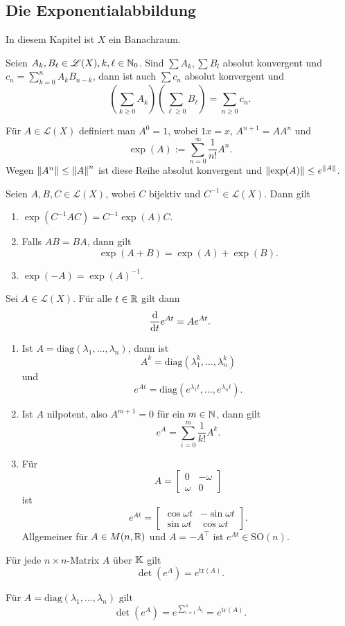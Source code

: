 \subsection{Die Exponentialabbildung}
In diesem Kapitel ist $X$ ein Banachraum.
\begin{satz}\label{satz4_10}
	Seien $A_k, B_\ell \in \mathscr{L}(X), k, \ell \in \mathbb{N}_0$. Sind $\sum A_k, \sum B_l$ absolut konvergent und $c_n = \sum_{k=0}^n A_k B_{n-k}$, dann ist auch $\sum c_n$ absolut konvergent und
	\[\left(\sum_{k\geq0} A_k\right)\left(\sum_{\ell \geq 0} B_\ell\right) = \sum_{n \geq 0} c_n.\]
\end{satz}
Für $A \in \mathscr{L}(X)$ definiert man $A^0 = 1$, wobei $1x = x$, $A^{n+1} = AA^n$ und
\[\exp(A) := \sum_{n = 0}^\infty \frac{1}{n!} A^n.\]
Wegen $\left\lVert A^n\right\rVert \leq \left\lVert A\right\rVert^n$ ist diese Reihe absolut konvergent und $\left\lVert\exp(A)\right\rVert \leq e^{\left\lVert A\right\rVert}$.
\begin{satz}\label{satz4_11}
	Seien $A, B, C \in \mathscr{L}(X)$, wobei $C$ bijektiv und $C^{-1} \in \mathscr{L}(X)$. Dann gilt
	\begin{enumerate}[label=(\alph*)]
		\item $\exp(C^{-1}AC) = C^{-1}\exp(A) C$.
		\item Falls $AB = BA$, dann gilt
		\[\exp(A + B) = \exp(A) + \exp(B).\]
		\item $\exp(-A) = \exp(A)^{-1}$.
	\end{enumerate}
\end{satz}
\begin{satz}\label{satz4_12}
	Sei $A \in \mathscr{L}(X)$. Für alle $t \in \mathbb{R}$ gilt dann
	\[\frac{\mathrm{d}}{\mathrm{d} t} e^{At} = A e^{At}.\]
\end{satz}
\begin{beispiel}
	\begin{enumerate}[label=(\arabic*)]
		\item Ist $A = \mathrm{diag}(\lambda_1, \dots, \lambda_n)$, dann ist
		\[A^k = \mathrm{diag}(\lambda_1^k, \dots, \lambda_n^k)\]
		und 
		\[e^{At} = \mathrm{diag}(e^{\lambda_1 t}, \dots, e^{\lambda_n t}).\]
		\item Ist $A$ nilpotent, also $A^{m+1} = 0$ für ein $m \in \mathbb{N}$, dann gilt
		\[e^A = \sum_{i=0}^m \frac{1}{k!}A^k.\]
		\item Für 
		\[A = \begin{bmatrix}
			0 & - \omega\\
			\omega & 0 
		\end{bmatrix}\]
		ist
		\[e^{At} = \begin{bmatrix}
			\cos \omega t & -\sin \omega t\\
			\sin \omega t & \cos \omega t
		\end{bmatrix}.\]
		Allgemeiner für $A \in M(n, \mathbb{R})$ und $A = -A^\top$ ist $e^{At} \in \mathrm{SO}(n)$.
	\end{enumerate}
\end{beispiel}
\begin{satz}\label{satz4_13}
	Für jede $n \times n$-Matrix $A$ über $\mathbb{K}$ gilt
	\[\det(e^A) = e^{\mathrm{tr}(A)}.\]
\end{satz}
\begin{rem}
	Für $A = \mathrm{diag}(\lambda_1, \dots, \lambda_n)$ gilt
	\[\det(e^A) = e^{\sum_{i=1}^n \lambda_i} = e^{\mathrm{tr}(A)}.\]
\end{rem}